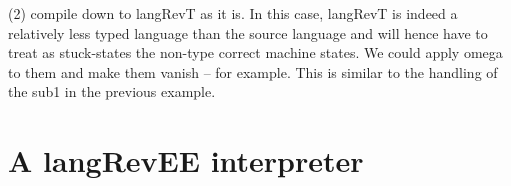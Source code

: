 \documentclass{llncs}
\begin{document}
(2) compile down to {{langRevT}} as it is. In this case, {{langRevT}}
is indeed a relatively less typed language than the source language
and will hence have to treat as stuck-states the non-type correct
machine states. We could apply omega to them and make them vanish --
for example. This is similar to the handling of the {{sub1}} in the
previous example. 

\section{A {{langRevEE}} interpreter}

%
%

\end{document}
